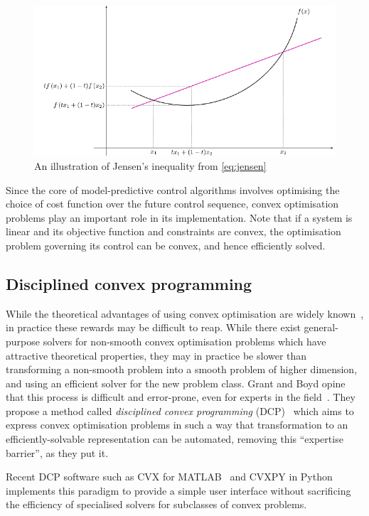 \begin{figure}
   \centering
   \includegraphics[width=12cm]{images/convexity}
   \caption{An illustration of Jensen's inequality from \autoref{eq:jensen}\footnotemark{}}
   \label{fig:convexity}
\end{figure}


Since the core of model-predictive control algorithms involves optimising the choice of cost function over the future control sequence, convex optimisation problems play an important role in its implementation.
Note that if a system is linear and its objective function and constraints are convex, the optimisation problem governing its control can be convex, and hence efficiently solved.

\subsection{Disciplined convex programming}

While the theoretical advantages of using convex optimisation are widely known~\cite{Luo06}, in practice these rewards may be difficult to reap.
While there exist general-purpose solvers for non-smooth convex optimisation problems which have attractive theoretical properties, they may in practice be slower than transforming a non-smooth problem into a smooth problem of higher dimension, and using an efficient solver for the new problem class.
Grant and Boyd opine that this process is difficult and error-prone, even for experts in the field~\cite{Grant08}.
They propose a method called \emph{disciplined convex programming} (DCP)~\cite{Grant06} which aims to express convex optimisation problems in such a way that transformation to an efficiently-solvable representation can be automated, removing this ``expertise barrier'', as they put it.

Recent DCP software such as CVX for MATLAB~\cite{CVX} and CVXPY in Python~\cite{CVXPY} implements this paradigm to provide a simple user interface without sacrificing the efficiency of specialised solvers for subclasses of convex problems.
